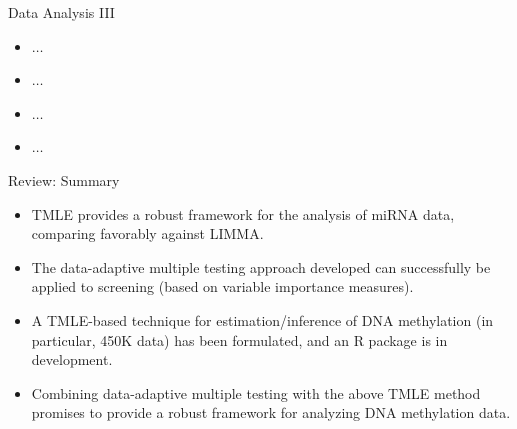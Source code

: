\documentclass[12pt,t]{beamer}
\begin{document}
\begin{frame}[c]{Data Analysis III}

\begin{center}
\begin{itemize}
  \itemsep12pt
  \item $\dots$
  \item $\dots$
  \item $\dots$
  \item $\dots$
\end{itemize}
\end{center}


\end{frame}



\begin{frame}[c]{Review: Summary}

\begin{center}
\begin{itemize}
  \itemsep12pt
  \item TMLE provides a robust framework for the analysis of miRNA data,
    comparing favorably against LIMMA.
  \item The data-adaptive multiple testing approach developed can successfully
    be applied to screening (based on variable importance measures).
  \item A TMLE-based technique for estimation/inference of DNA methylation
    (in particular, 450K data) has been formulated, and an R package is in
    development.
  \item Combining data-adaptive multiple testing with the above TMLE method
    promises to provide a robust framework for analyzing DNA methylation data.
\end{itemize}
\end{center}


\end{frame}
\end{document}
